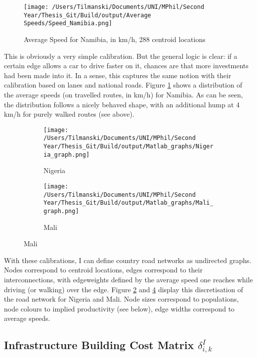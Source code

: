 \documentclass[11pt, oneside]{article}   	%
\begin{document}
\begin{figure}[!b]
  \centering
  \texttt{[image: /Users/Tilmanski/Documents/UNI/MPhil/Second Year/Thesis\_Git/Build/output/Average Speeds/Speed\_Namibia.png]}
  \caption{Average Speed for Namibia, in km/h, 288 centroid locations}
  \label{fig:speed_namibia}
\end{figure}

This is obviously a very simple calibration. But the general logic is clear: if a certain edge allows a car to drive faster on it, chances are that more investments had been made into it. In a sense, this captures the same notion \citeauthor{fajgelbaum_optimal_2017} with their calibration based on lanes and national roads. Figure \ref{fig:speed_namibia} shows a distribution of the average speeds (on travelled routes, in km/h) for Namibia. As can be seen, the distribution follows a nicely behaved shape, with an additional hump at 4 km/h for purely walked routes (see above).

\begin{figure}[h]
\centering
\caption{Discretised Networks for different countries}

\begin{subfigure}[c]{0.48\textwidth}
\texttt{[image: /Users/Tilmanski/Documents/UNI/MPhil/Second Year/Thesis\_Git/Build/output/Matlab\_graphs/Nigeria\_graph.png]}
\caption{Nigeria}
\label{fig:nigeria_mat}
\end{subfigure}
\begin{subfigure}[c]{0.48\textwidth}
\texttt{[image: /Users/Tilmanski/Documents/UNI/MPhil/Second Year/Thesis\_Git/Build/output/Matlab\_graphs/Mali\_graph.png]}
\caption{Mali}
\label{fig:Mali_mat}
\end{subfigure}

\end{figure}

With these calibrations, I can define country road networks as undirected graphs. Nodes correspond to centroid locations, edges correspond to their interconnections, with edgeweights defined by the average speed one reaches while driving (or walking) over the edge. Figure \ref{fig:nigeria_mat} and \ref{fig:Mali_mat} display this discretisation of the road network for Nigeria and Mali. Node sizes correspond to populations, node colours to implied productivity (see below), edge widths correspond to average speeds.

\subsection{Infrastructure Building Cost Matrix $\delta^{I}_{i,k}$}
\end{document}
